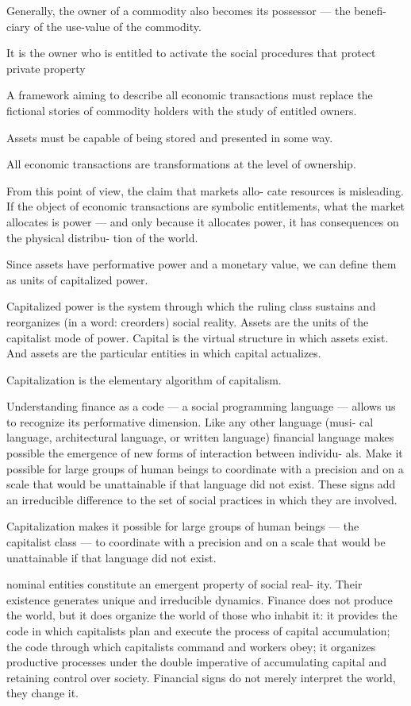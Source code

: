 \documentclass[
]{book}
\begin{document}
Generally, the owner of a commodity also becomes its possessor --- the benefi-
ciary of the use-value of the commodity.

It is the owner who is entitled
to activate the social procedures that protect private property

A framework aiming to describe all economic
transactions must replace the fictional stories of commodity holders with the
study of entitled owners.

Assets must be capable of
being stored and presented in some way.

All economic transactions are transformations at the level of ownership.

From this point of view, the claim that markets allo-
cate resources is misleading. If the object of economic transactions are
symbolic entitlements, what the market allocates is power --- and only
because it allocates power, it has consequences on the physical distribu-
tion of the world.

Since assets have performative power and a monetary value, we can define
them as units of capitalized power.

Capitalized power is the system through which the ruling class sustains and
reorganizes (in a word: creorders) social reality.
Assets are the units of the
capitalist mode of power. Capital is the virtual structure in which assets exist.
And assets are the particular entities in which capital actualizes.

Capitalization is the elementary algorithm of capitalism.

Understanding finance as a code --- a social programming language --- allows
us to recognize its performative dimension. Like any other language (musi-
cal language, architectural language, or written language) financial language
makes possible the emergence of new forms of interaction between individu-
als.
Make it
possible for large groups of human beings to coordinate with a precision and
on a scale that would be unattainable if that language did not exist. These
signs add an irreducible difference to the set of social practices in which they
are involved.

Capitalization makes it possible for large
groups of human beings --- the capitalist class --- to coordinate with a precision
and on a scale that would be unattainable if that language did not exist.

nominal entities constitute an emergent property of social real-
ity. Their existence generates unique and irreducible dynamics. Finance does
not produce the world, but it does organize the world of those who inhabit it:
it provides the code in which capitalists plan and execute the process of capital
accumulation; the code through which capitalists command and workers obey;
it organizes productive processes under the double imperative of accumulating
capital and retaining control over society. Financial signs do
not merely interpret the world, they change it.
\end{document}
